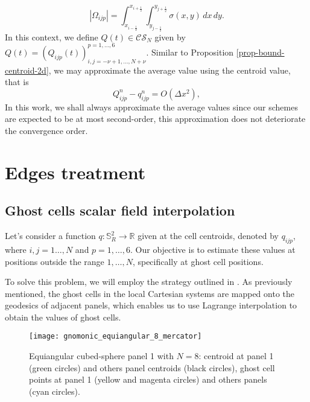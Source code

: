 \begin{equation*}
	|\Omega_{ijp}| = \int_{x_{i-\frac{1}{2}}}^{x_{i+\frac{1}{2}}} \int_{y_{j-\frac{1}{2}}}^{y_{j+\frac{1}{2}}}{\sigma(x,y)} \,dx \,dy.
\end{equation*}
In this context, we define $Q(t) \in \mathcal{CS}_N$ given by 
$Q(t) = (Q_{ijp}(t))_{i,j = -\nu +1, \ldots, N+\nu}^{p=1,\ldots,6}$.
Similar to Proposition \ref{prop-bound-centroid-2d}, we may approximate the average value using the centroid value, that is
\begin{equation*}
	Q_{ijp}^n - q_{ijp}^n = O(\Delta x ^2), 
\end{equation*}
In this work, we shall always approximate the average values since our schemes are expected to be at most second-order,
this approximation does not deteriorate the convergence order.

\section{Edges treatment}
\label{cs-halodata}
\subsection{Ghost cells scalar field interpolation}
\label{cs-interp}
Let's consider a function $q: \mathbb{S}^2_R \to \mathbb{R}$ given at the cell centroids, 
denoted by $q_{ijp}$, where $i, j=1\ldots, N$ and $p=1,\ldots, 6$. 
Our objective is to estimate these values at positions outside the range $1, \ldots, N$, specifically at ghost cell positions.

To solve this problem, we will employ the strategy outlined in \citet{zerroukat:2022}. 
As previously mentioned, the ghost cells in the local Cartesian systems are mapped onto the geodesics 
of adjacent panels, which enables us to use Lagrange interpolation to obtain the values of ghost cells.
\begin{figure}[!htb]
	\centering
	\texttt{[image: gnomonic\_equiangular\_8\_mercator]}
	\caption{Equiangular cubed-sphere panel 1 with $N=8$: 
	centroid at panel 1 (green circles) and others panel centroids (black circles), 
	ghost cell points at panel 1 (yellow and magenta circles) and others panels (cyan circles).}
	\label{chp4-cs-halodata}
\end{figure}

